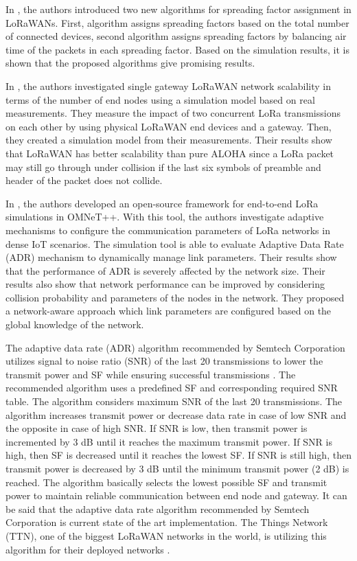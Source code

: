 In \cite{8115779}, the authors introduced two new algorithms for spreading factor assignment in LoRaWANs. First, algorithm assigns spreading factors based on the total number of connected devices, second algorithm assigns spreading factors by balancing air time of the packets in each spreading factor. Based on the simulation results, it is shown that the proposed algorithms give promising results.

In \cite{s17061193}, the authors investigated single gateway LoRaWAN network scalability in terms of the number of end nodes using a simulation model based on real measurements. They measure the impact of two concurrent LoRa transmissions on each other by using physical LoRaWAN end devices and a gateway. Then, they created a simulation model from their measurements. Their results show that LoRaWAN has better scalability than pure ALOHA since a LoRa packet may still go through under collision if the last six symbols of preamble and header of the packet does not collide.

In \cite{8406255}, the authors developed an open-source framework for end-to-end LoRa simulations in OMNeT++. With this tool, the authors investigate adaptive mechanisms to configure the communication parameters of LoRa networks in dense IoT scenarios. The simulation tool is able to evaluate Adaptive Data Rate (ADR) mechanism to dynamically manage link parameters. Their results show that the performance of ADR is severely affected by the network size. Their results also show that network performance can be improved by considering collision probability and  parameters of the nodes in the network. They proposed a network-aware approach which link parameters are configured based on the global knowledge of the network.

The adaptive data rate (ADR) algorithm recommended by Semtech Corporation utilizes signal to noise ratio (SNR) of the last 20 transmissions to lower the transmit power and SF while ensuring successful transmissions \cite{lorawan_adr}. The recommended algorithm uses a predefined SF and corresponding required SNR table. The algorithm considers maximum SNR of the last 20 transmissions. The algorithm increases transmit power or decrease data rate in case of low SNR and the opposite in case of high SNR. If SNR is low, then transmit power is incremented by 3 dB until it reaches the maximum transmit power. If SNR is high, then SF is decreased until it reaches the lowest SF. If SNR is still high, then transmit power is decreased by 3 dB until the minimum transmit power (2 dB) is reached. The algorithm basically selects the lowest possible SF and transmit power to maintain reliable communication between end node and gateway. It can be said that the adaptive data rate algorithm recommended by Semtech Corporation is current state of the art implementation. The Things Network (TTN), one of the biggest LoRaWAN networks in the world, is utilizing this algorithm for their deployed networks \cite{ttn_adr}.
